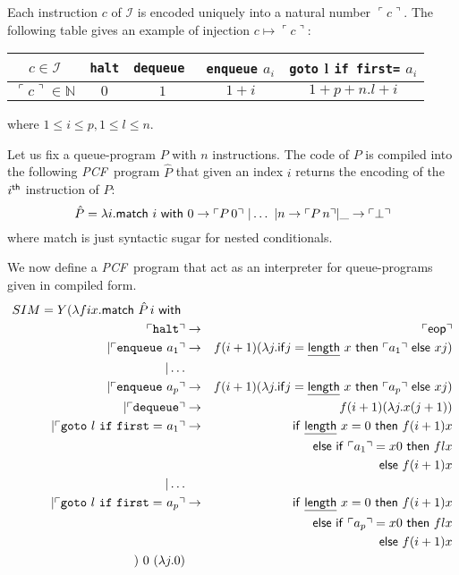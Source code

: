 \documentclass{article}
\newcommand{\encode}[1]{\ulcorner #1 \urcorner}
\newcommand{\nat}{\mathbb{N}}
\newcommand\eop{{\sf eop}}
\newcommand\pcf{\textsl{PCF}}
\begin{document}
Each instruction $c$ of $\mathcal{I}$ is encoded uniquely into a natural number $\encode{c}$. The following table gives an example of injection $c\mapsto\encode{c}$:
\begin{center}
\begin{tabular}{c|c|c|c|c}
$c \in \mathcal{I}$ & {\tt halt} & {\tt dequeue } & {\tt enqueue} $a_i$ &  {\tt goto} l {\tt if first=} $a_i$ \\ \hline
$\encode{ c } \in \nat$ & $0$ & $1$ & $1+i$ & $1+p + n.l +i$ \\
\end{tabular}
\end{center}
where $1 \leq i \leq p, 1 \leq l \leq n$.

Let us fix a queue-program $P$ with $n$ instructions.
The code of $P$ is compiled into the following \pcf\ program $\hat{P}$
that given an index $i$ returns the encoding of the $i^{\sf th}$ instruction of $P$:
\begin{equation}
\hat{P} = \lambda i .  {\sf match\ } i {\sf \ with\ }
   0 \rightarrow \encode{ P\, 0 }
  \ | \ldots \ | n \rightarrow \encode{ P\, n }  | \_ \rightarrow \encode{\bot}
\end{equation}
where {\sf match} is just syntactic sugar for nested conditionals.

We now define a \pcf\ program that act as an interpreter for queue-programs given in compiled form.
\begin{eqnarray*}
SIM = Y ( \lambda f i x . {\sf match\ } \hat{P}\, i  {\sf \ with\ }   \\
 \encode{ \tt halt }&\rightarrow& \encode{\eop} \\
| \encode{ {\tt enqueue\ } a_1 } &\rightarrow& f (i+1) ( \lambda j . {\sf if} j = \underline{\sf length}\ x\ {\sf then\ } \encode{a_1} {\sf\ else\ } x j ) \\
| \ldots \\
| \encode{ {\tt enqueue\ } a_p } &\rightarrow& f (i+1) ( \lambda j . {\sf if} j = \underline{\sf length}\ x\ {\sf then\ } \encode{a_p} {\sf\ else\ } x j ) \\
| \encode{ {\tt dequeue } } &\rightarrow& f (i+1) (\lambda j . x (j+1) ) \\
| \encode{ {\tt goto\ } l {\tt\ if\ first=\ } a_1 } &\rightarrow&
{\sf if\ } \underline{\sf length}\ x = 0 {\ \sf then\ } f (i+1) x \\
&&{\sf else\ if\ } \encode{a_1} = x 0 {\sf\ then\ } f l x \\
&&{\sf else\ } f (i+1) x \\
| \ldots \\
| \encode{{\tt goto\ } l {\tt\ if\ first=\ } a_p} &\rightarrow&
{\sf if\ } \underline{\sf length}\ x = 0 {\ \sf then\ } f (i+1) x \\
&&{\sf else\ if\ } \encode{a_p} = x 0 {\sf\ then\ } f l x \\
&&{\sf else\ } f (i+1) x \\
)\ 0\ (\lambda j . 0)
\end{eqnarray*}
\end{document}
